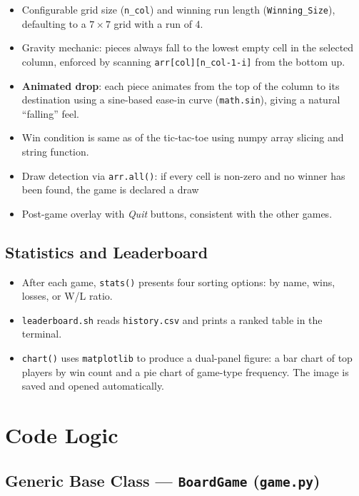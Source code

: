 \documentclass[12pt]{article}
\begin{document}
\begin{itemize}
    \item Configurable grid size (\texttt{n\_col}) and winning run length (\texttt{Winning\_Size}), defaulting to a $7 \times 7$ grid with a run of 4.
    \item Gravity mechanic: pieces always fall to the lowest empty cell in the selected column, enforced by scanning \texttt{arr[col][n\_col-1-i]} from the bottom up.
    \item \textbf{Animated drop}: each piece animates from the top of the column to its destination using a sine-based ease-in curve (\texttt{math.sin}), giving a natural ``falling'' feel.
    \item Win condition is same as of the tic-tac-toe using numpy array slicing and string function.
    \item Draw detection via \texttt{arr.all()}: if every cell is non-zero and no winner has been found, the game is declared a draw 
    \item Post-game overlay with \textit{Quit} buttons, consistent with the other games.
\end{itemize}
 
\subsection{Statistics and Leaderboard}
 
\begin{itemize}
    \item After each game, \texttt{stats()} presents four sorting options: by name, wins, losses, or W/L ratio.
    \item \texttt{leaderboard.sh} reads \texttt{history.csv} and prints a ranked table in the terminal.
    \item \texttt{chart()} uses \texttt{matplotlib} to produce a dual-panel figure: a bar chart of top players by win count and a pie chart of game-type frequency. The image is saved and opened automatically.
\end{itemize}
 
\section{Code Logic}
 
\subsection{Generic Base Class --- \texttt{BoardGame} (\texttt{game.py})}
 
\end{document}

